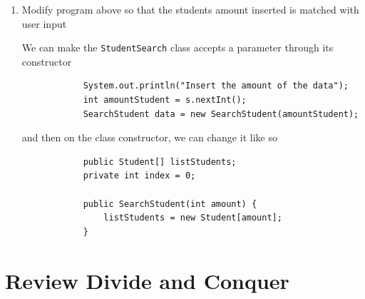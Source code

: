 \documentclass[12pt,titlepage]{article}
\begin{document}
\begin{enumerate}
{        It says that it didn't found the data.
    }
    \item {
        Modify program above so that the students amount inserted is matched with user input

        We can make the \texttt{StudentSearch} class accepts a parameter through its constructor

        \begin{verbatim}
            System.out.println("Insert the amount of the data");
            int amountStudent = s.nextInt();
            SearchStudent data = new SearchStudent(amountStudent);
        \end{verbatim}

        and then on the class constructor, we can change it like so

        \begin{verbatim}
            public Student[] listStudents;
            private int index = 0;

            public SearchStudent(int amount) {
                listStudents = new Student[amount];
            }
        \end{verbatim}
    }
\end{enumerate}

\section{Review Divide and Conquer}
\end{document}
